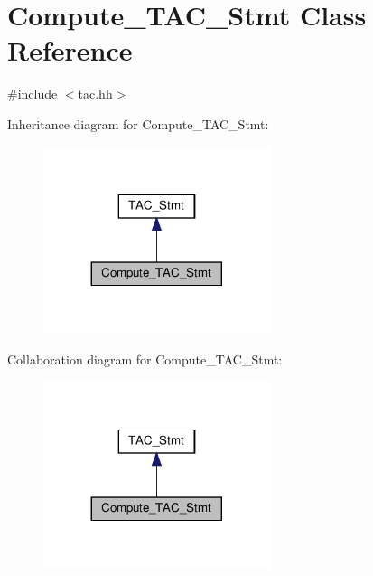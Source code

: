 \hypertarget{classCompute__TAC__Stmt}{}\section{Compute\+\_\+\+T\+A\+C\+\_\+\+Stmt Class Reference}
\label{classCompute__TAC__Stmt}


{\ttfamily \#include $<$tac.\+hh$>$}



Inheritance diagram for Compute\+\_\+\+T\+A\+C\+\_\+\+Stmt\+:
\nopagebreak
\begin{figure}[H]
\begin{center}
\leavevmode
\includegraphics[width=188pt]{classCompute__TAC__Stmt__inherit__graph}
\end{center}
\end{figure}


Collaboration diagram for Compute\+\_\+\+T\+A\+C\+\_\+\+Stmt\+:
\nopagebreak
\begin{figure}[H]
\begin{center}
\leavevmode
\includegraphics[width=188pt]{classCompute__TAC__Stmt__coll__graph}
\end{center}
\end{figure}
